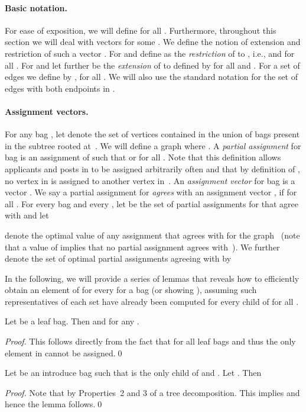 \documentclass{llncs}
\begin{document}
\paragraph{Basic notation.}
For ease of exposition, we will define  for all . Furthermore, throughout this section we will deal with vectors  for some . We define the notion of extension and restriction of such a vector .
For  and  define  as the \emph{restriction} of  to , i.e.,  and  for all . For  and  let further  be the \emph{extension} of  to  defined by  for all  and . 
For a set of edges  we define  by , for all .
We will also use the standard notation  for the set of edges with both endpoints in .

\paragraph{Assignment vectors.}
For any bag , let  denote the set of vertices contained in the union of bags present in the subtree rooted at~. We will define a graph  where . A \emph{partial assignment} for bag  is an assignment  of  such that  or  for all . Note that this definition allows applicants and posts in  to be assigned arbitrarily often and that by definition of , no vertex in  is assigned to another vertex in~. An \emph{assignment vector} for bag  is a vector . We say a partial assignment  for  \emph{agrees} with an assignment vector , if  for all .
For every bag  and every , let  be the set of partial assignments for  that agree with  and let 

denote the optimal value of any assignment that agrees with  for the graph~ (note that a value of  implies that no partial assignment  agrees with~). We further denote the set of optimal partial assignments agreeing with  by

In the following, we will provide a series of lemmas that reveals how to efficiently obtain an element of  for every  for a bag   (or showing ), assuming such representatives of each set  have already been computed for every child  of  for all .

\begin{lemma}\label{lem:leaf}
	Let  be a leaf bag. Then  and  for any .
\end{lemma}
\begin{proof}
This follows directly from the fact that  for all leaf bags and thus the only element in  cannot be assigned.\qed
\end{proof}

\begin{lemma}\label{lem:introduce}
	Let  be an introduce bag such that  is the only child of  and . Let . Then
	 
\end{lemma}
\begin{proof}
  Note that  by Properties~2 and 3 of a tree decomposition. This implies  and hence the lemma follows.\qed
\end{proof}
\end{document}
